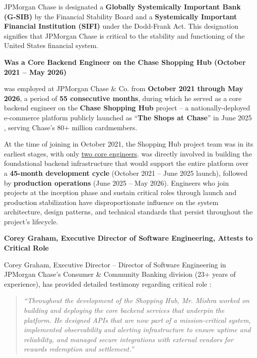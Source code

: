 JPMorgan Chase is designated a \textbf{Globally Systemically Important Bank (G-SIB)} by the Financial Stability Board and a \textbf{Systemically Important Financial Institution (SIFI)} under the Dodd-Frank Act. This designation signifies that JPMorgan Chase is critical to the stability and functioning of the United States financial system.

\textbf{\dr Was a Core Backend Engineer on the Chase Shopping Hub (October 2021 -- May 2026)}

\dr was employed at JPMorgan Chase \& Co. from \textbf{October 2021 through May 2026}, a period of \textbf{55 consecutive months}, during which he served as a core backend engineer on the \textbf{Chase Shopping Hub} project -- a nationally-deployed e-commerce platform publicly launched as ``\textbf{The Shops at Chase}'' in June 2025 \cite{CR1}, serving Chase's 80+ million cardmembers.

At the time of joining in October 2021, the Shopping Hub project team was in its earliest stages, with only \underline{two core engineers}. \dr was directly involved in building the foundational backend infrastructure that would support the entire platform over a \textbf{45-month development cycle} (October 2021 -- June 2025 launch), followed by \textbf{production operations} (June 2025 -- May 2026). Engineers who join projects at the inception phase and sustain critical roles through launch and production stabilization have disproportionate influence on the system architecture, design patterns, and technical standards that persist throughout the project's lifecycle.

\textbf{Corey Graham, Executive Director of Software Engineering, Attests to \drs Critical Role}

Corey Graham, Executive Director -- Director of Software Engineering in JPMorgan Chase's Consumer \& Community Banking division (23+ years of experience), has provided detailed testimony regarding \drs critical role \cite{CR2}:

\begin{quote}
\textit{``Throughout the development of the Shopping Hub, Mr. Mishra worked on building and deploying the core backend services that underpin the platform. He designed APIs that are now part of a mission-critical system, implemented observability and alerting infrastructure to ensure uptime and reliability, and managed secure integrations with external vendors for rewards redemption and settlement.''}
\end{quote}

